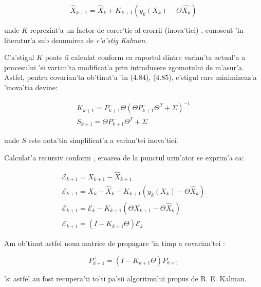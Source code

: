 \documentclass[12pt,a4paper,twoside]{report}
\begin{document}
\begin{equation}
    \hat X_{k+1} = \hat X_k + K_{k+1} ({y_k}(X_k) - \Theta \hat {X_k})
\end{equation}

unde $K$ reprezint'a un factor de corec'tie al erorrii (inova'tiei) \cite{Kalman1D}, cunoscut 'in literatur'a sub denumirea de \textit{c'a'stig Kalman}.

\vspace{5px}

C'a'stigul $K$ poate fi calculat conform \cite{Kalman1D} ca raportul dintre varian'ta actual'a a procesului 'si varian'ta modificat'a prin introducere zgomotului de m'asur'a. Astfel, pentru covarian'ta ob'tinut'a 'in (4.84), (4.85), c\ia 'stigul care  minimizeaz'a 'inova'tia devine:

\begin{gather}
    K_{k+1} = P^-_{k+1} \Theta (\Theta P^-_{k+1} \Theta^T + \Sigma)^{-1} \\
    S_{k+1} = \Theta P^-_{k+1} \Theta^T + \Sigma
\end{gather}

unde $S$ este nota'tia simplificat'a a varian'tei inova'tiei.

\vspace{5px}

Calculat'a recursiv conform \cite{CoVarUpd} \cite{10.1115/1.3662552}, eroarea de la punctul urm'ator se exprim'a ca:

\begin{gather}
    \mathcal{E}_{k+1} = X_{k+1} - \hat X_{k+1} \\
    \mathcal{E}_{k+1} = X_{k} - \hat X_{k} -  K_{k+1} ({y_k}(X_k) - \Theta \hat X_k) \\
    \mathcal{E}_{k+1} = \mathcal{E}_{k}  -  K_{k+1} (\Theta X_{k+1} - \Theta \hat X_k ) \\
   \mathcal{E}_{k+1} = (I - K_{k+1} \Theta) \mathcal{E}_{k}
\end{gather}

Am ob'tinut astfel noua matrice de propagare 'in timp a covarian'tei \cite{CoVarUpd}:

\begin{equation}
    P^+_{k+1} = (I - K_{k+1} \Theta) P^-_{k+1}
\end{equation}

'si astfel au fost recupera'ti to'ti pa'sii algoritmului propus de R. E. Kalman.

\vspace{5px}
\end{document}

